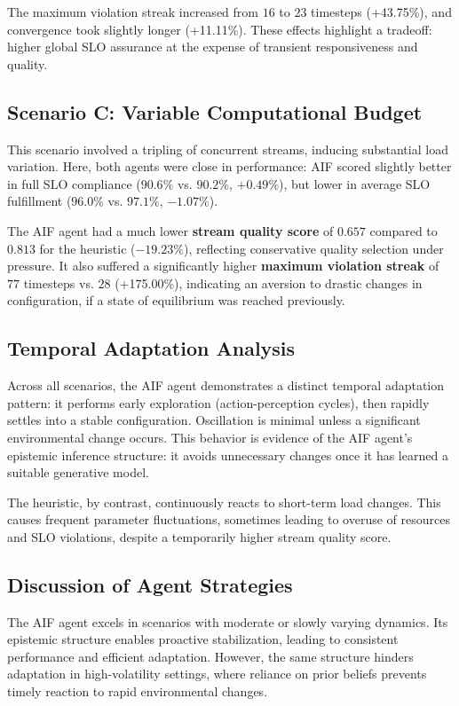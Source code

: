 The maximum violation streak increased from \(16\) to \(23\) timesteps (+43.75\%), and convergence took slightly longer (+11.11\%). These effects highlight a tradeoff: higher global SLO assurance at the expense of transient responsiveness and quality.

\subsection{Scenario C: Variable Computational Budget}
This scenario involved a tripling of concurrent streams, inducing substantial load variation. Here, both agents were close in performance: AIF scored slightly better in full SLO compliance (\(90.6\%\) vs. \(90.2\%\), \(+0.49\%\)), but lower in average SLO fulfillment (\(96.0\%\) vs. \(97.1\%\), \(-1.07\%\)).

The AIF agent had a much lower \textbf{stream quality score} of \(0.657\) compared to \(0.813\) for the heuristic (\(-19.23\%\)), reflecting conservative quality selection under pressure. It also suffered a significantly higher \textbf{maximum violation streak} of \(77\) timesteps vs. \(28\) (+175.00\%), indicating an aversion to drastic changes in configuration, if a state of equilibrium was reached previously.

\subsection{Temporal Adaptation Analysis}
Across all scenarios, the AIF agent demonstrates a distinct temporal adaptation pattern: it performs early exploration (action-perception cycles), then rapidly settles into a stable configuration. Oscillation is minimal unless a significant environmental change occurs. This behavior is evidence of the AIF agent's epistemic inference structure: it avoids unnecessary changes once it has learned a suitable generative model.

The heuristic, by contrast, continuously reacts to short-term load changes. This causes frequent parameter fluctuations, sometimes leading to overuse of resources and SLO violations, despite a temporarily higher stream quality score.


\subsection{Discussion of Agent Strategies}
The AIF agent excels in scenarios with moderate or slowly varying dynamics. Its epistemic structure enables proactive stabilization, leading to consistent performance and efficient adaptation. However, the same structure hinders adaptation in high-volatility settings, where reliance on prior beliefs prevents timely reaction to rapid environmental changes.

